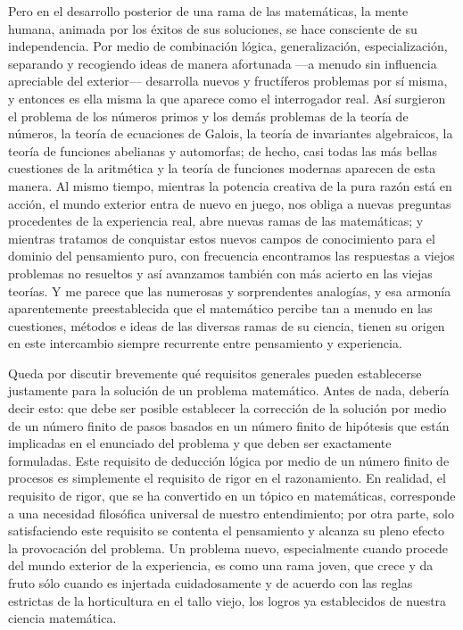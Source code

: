 \documentclass[a4paper, 12pt]{article}
\begin{document}
 Pero en el desarrollo posterior de una rama de las matemáticas, la mente humana, animada por los éxitos de sus soluciones, se hace consciente de su independencia. Por medio de combinación lógica, generalización, especialización, separando y recogiendo ideas de manera afortunada ---a menudo sin influencia apreciable del exterior--- desarrolla nuevos y fructíferos problemas por sí misma, y entonces es ella misma la que aparece como el interrogador real. Así surgieron el problema de los números primos y los demás problemas de la teoría de números, la teoría de ecuaciones de Galois, la teoría de invariantes algebraicos, la teoría de funciones abelianas y automorfas; de hecho, casi todas las más bellas cuestiones de la aritmética y la teoría de funciones modernas aparecen de esta manera. Al mismo tiempo, mientras la potencia creativa de la pura razón está en acción, el mundo exterior entra de nuevo en juego, nos obliga a nuevas preguntas procedentes de la experiencia real, abre nuevas ramas de las matemáticas; y mientras tratamos de conquistar estos nuevos  campos de conocimiento para el dominio del pensamiento puro, con frecuencia encontramos las respuestas a viejos problemas no resueltos y así  avanzamos también con más acierto en las viejas teorías. Y me parece que las numerosas y sorprendentes analogías, y esa armonía aparentemente preestablecida que el matemático percibe tan a menudo en las cuestiones, métodos e ideas de las diversas ramas de su ciencia, tienen su origen  en este intercambio siempre recurrente entre pensamiento y experiencia.
 
 
 
Queda por discutir brevemente qué requisitos generales pueden establecerse justamente para la solución de un problema matemático. Antes  de nada, debería decir esto: que debe ser posible establecer la corrección de la solución por medio de un número finito de pasos basados en un número finito de hipótesis que están implicadas en el enunciado del problema 
y que deben ser exactamente formuladas. Este requisito de deducción lógica por medio de un número finito de procesos es simplemente el requisito de rigor en el razonamiento. En realidad, el requisito de rigor, que se ha convertido en un tópico en matemáticas, corresponde a una necesidad filosófica universal de nuestro entendimiento; por otra parte, solo satisfaciendo este requisito se contenta el pensamiento y alcanza su pleno  efecto la provocación del problema. Un problema nuevo, especialmente  cuando procede del mundo exterior de la experiencia, es como una rama joven, que crece y da fruto sólo cuando es injertada cuidadosamente y de acuerdo con las reglas estrictas de la horticultura en el tallo viejo, los logros ya establecidos de nuestra ciencia matemática. 
\end{document}
